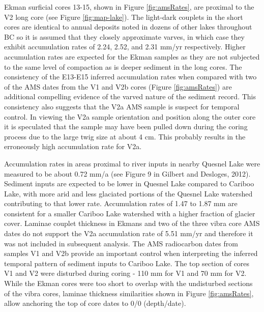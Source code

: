 \documentclass[Royal,times,doublespace,sageh]{sagej}
\begin{document}
Ekman surficial cores 13-15, shown in Figure \ref{fig:amsRates}, are
proximal to the V2 long core (see Figure \ref{fig:map-lake}). The
light-dark couplets in the short cores are identical to annual deposits
noted in dozens of other lakes throughout BC \citep[e.g.][]{Hodder2007}
so it is assumed that they closely approximate varves, in which case
they exhibit accumulation rates of 2.24, 2.52, and 2.31 mm/yr
respectively. Higher accumulation rates are expected for the Ekman
samples as they are not subjected to the same level of compaction as is
deeper sediment in the long cores. The consistency of the E13-E15
inferred accumulation rates when compared with two of the AMS dates from
the V1 and V2b cores (Figure \ref{fig:amsRates}) are additional
compelling evidence of the varved nature of the sediment record. This
consistency also suggests that the V2a AMS sample is suspect for
temporal control. In viewing the V2a sample orientation and position
along the outer core it is speculated that the sample may have been
pulled down during the coring process due to the large twig size at
about 4 cm. This probably results in the erroneously high accumulation
rate for V2a.

Accumulation rates in areas proximal to river inputs in nearby Quesnel
Lake were measured to be about 0.72 mm/a (see Figure 9 in Gilbert and
Desloges, 2012). Sediment inputs are expected to be lower in Quesnel
Lake compared to Cariboo Lake, with more arid and less glaciated
portions of the Quesnel Lake watershed contributing to that lower rate.
Accumulation rates of 1.47 to 1.87 mm are consistent for a smaller
Cariboo Lake watershed with a higher fraction of glacier cover. Laminae
couplet thickness in Ekmans and two of the three vibra core AMS dates do
not support the V2a accumulation rate of 5.51 mm/yr and therefore it was
not included in subsequent analysis. The AMS radiocarbon dates from
samples V1 and V2b provide an important control when interpreting the
inferred temporal pattern of sediment inputs to Cariboo Lake. The top
section of cores V1 and V2 were disturbed during coring - 110 mm for V1
and 70 mm for V2. While the Ekman cores were too short to overlap with
the undisturbed sections of the vibra cores, laminae thickness
similarities shown in Figure \ref{fig:amsRates}, allow anchoring the top
of core dates to 0/0 (depth/date).
\end{document}

